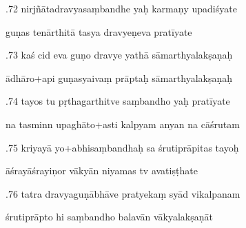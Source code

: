 \documentclass[article,12pt,a4paper]{memoir}%
\newcounter{parCount}
\begin{document}
	  
	  \pstart {}.72 nirjñātadravyasaṃbandhe yaḥ karmaṇy upadiśyate 
	{}
	\pend%
      

	  
	  \pstart \leavevmode%
	guṇas tenārthitā tasya dravyeṇeva pratīyate 
	{}
	\pend%
      

	  
	  \pstart {}.73 kaś cid eva guṇo dravye yathā sāmarthyalakṣaṇaḥ 
	{}
	\pend%
      

	  
	  \pstart \leavevmode%
	ādhāro+api guṇasyaivaṃ prāptaḥ sāmarthyalakṣaṇaḥ 
	{}
	\pend%
      

	  
	  \pstart {}.74 tayos tu pṛthagarthitve saṃbandho yaḥ pratīyate 
	{}
	\pend%
      

	  
	  \pstart \leavevmode%
	na tasminn upaghāto+asti kalpyam anyan na cāśrutam 
	{}
	\pend%
      

	  
	  \pstart {}.75 kriyayā yo+abhisaṃbandhaḥ sa śrutiprāpitas tayoḥ 
	{}
	\pend%
      

	  
	  \pstart \leavevmode%
	āśrayāśrayiṇor vākyān niyamas tv avatiṣṭhate 
	{}
	\pend%
      

	  
	  \pstart {}.76 tatra dravyaguṇābhāve pratyekaṃ syād vikalpanam 
	{}
	\pend%
      

	  
	  \pstart \leavevmode%
	śrutiprāpto hi saṃbandho balavān vākyalakṣaṇāt 
	{}
	\pend%
      
\end{document}
